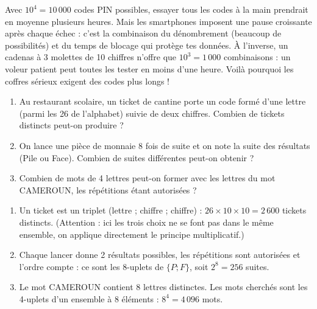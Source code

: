 \documentclass[11pt]{article}
\begin{document}
\begin{savaistu}
Avec $10^4 = 10\,000$ codes PIN possibles, essayer tous les codes à la main prendrait en moyenne plusieurs heures. Mais les smartphones imposent une pause croissante après chaque échec : c'est la combinaison du dénombrement (beaucoup de possibilités) et du temps de blocage qui protège tes données. À l'inverse, un cadenas à 3 molettes de 10 chiffres n'offre que $10^3 = 1\,000$ combinaisons : un voleur patient peut toutes les tester en moins d'une heure. Voilà pourquoi les coffres sérieux exigent des codes plus longs !
\end{savaistu}

\begin{exercice}
\begin{enumerate}
\item Au restaurant scolaire, un ticket de cantine porte un code formé d'une lettre (parmi les 26 de l'alphabet) suivie de deux chiffres. Combien de tickets distincts peut-on produire ?
\item On lance une pièce de monnaie 8 fois de suite et on note la suite des résultats (Pile ou Face). Combien de suites différentes peut-on obtenir ?
\item Combien de mots de 4 lettres peut-on former avec les lettres du mot CAMEROUN, les répétitions étant autorisées ?
\end{enumerate}
\end{exercice}

\begin{corrige}[Exercice 1]
\begin{enumerate}
\item Un ticket est un triplet (lettre ; chiffre ; chiffre) : $26 \times 10 \times 10 = 2\,600$ tickets distincts. (Attention : ici les trois choix ne se font pas dans le même ensemble, on applique directement le principe multiplicatif.)
\item Chaque lancer donne 2 résultats possibles, les répétitions sont autorisées et l'ordre compte : ce sont les 8-uplets de $\{P ; F\}$, soit $2^8 = 256$ suites.
\item Le mot CAMEROUN contient 8 lettres distinctes. Les mots cherchés sont les 4-uplets d'un ensemble à 8 éléments : $8^4 = 4\,096$ mots.
\end{enumerate}
\end{corrige}
\end{document}

